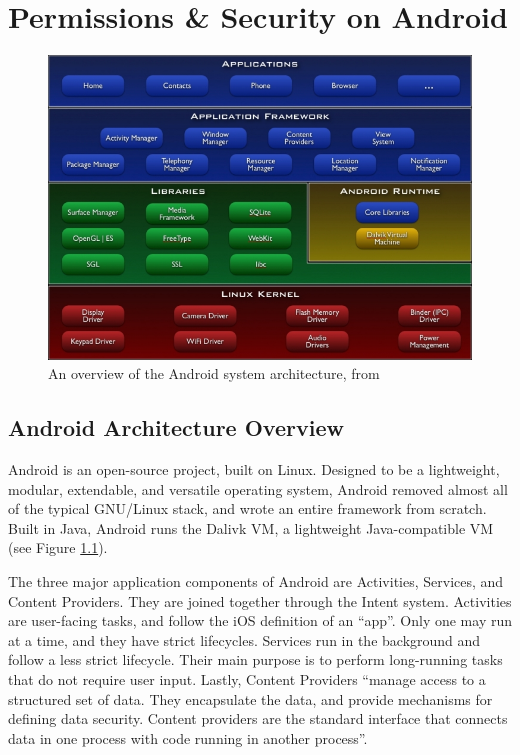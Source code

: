 \chapter{Permissions \& Security on Android}
\label{sec:permissions}

\begin{figure}[t]
\begin{center}
\includegraphics[width=0.7\columnwidth]{figs/system-architecture}
\caption{An overview of the Android system architecture, from \citep{androidarchitectureoverview}}
\label{fig:androidoverview}
\end{center}
\end{figure}


\section{Android Architecture Overview}
Android is an open-source project, built on Linux. Designed to be a lightweight, modular, extendable, and versatile operating system, Android removed almost all of the typical GNU/Linux stack, and wrote an entire framework from scratch. Built in Java, Android runs the Dalivk VM, a lightweight Java-compatible VM (see Figure \ref{fig:androidoverview}). 

The three major application components of Android are Activities, Services, and Content Providers. They are joined together through the Intent system. Activities are user-facing tasks, and follow the iOS definition of an ``app''. Only one may run at a time, and they have strict lifecycles. Services run in the background and follow a less strict lifecycle. Their main purpose is to perform long-running tasks that do not require user input. Lastly, Content Providers ``manage access to a structured set of data. They encapsulate the data, and provide mechanisms for defining data security. Content providers are the standard interface that connects data in one process with code running in another process''\citep{androidcontentproviders}.

